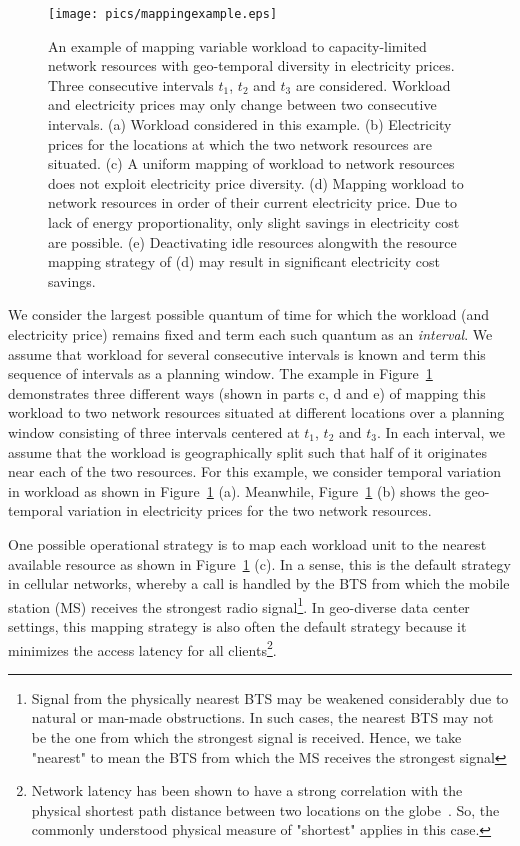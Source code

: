 \begin{figure}
\centering
\texttt{[image: pics/mappingexample.eps]}
\caption{An example of mapping variable workload to capacity-limited network resources with geo-temporal diversity in electricity prices. Three consecutive intervals $t_1$, $t_2$ and $t_3$ are considered. Workload and electricity prices may only change between two consecutive intervals. (a) Workload considered in this example. (b) Electricity prices for the locations at which the two network resources are situated. (c) A uniform mapping of workload to network resources does not exploit electricity price diversity. (d) Mapping workload to network resources in order of their current electricity price. Due to lack of energy proportionality, only slight savings in electricity cost are possible. (e) Deactivating idle resources alongwith the resource mapping strategy of (d) may result in significant electricity cost savings.}
\label{fig:mappingexample}
\end{figure}

We consider the largest possible quantum of time for which the workload (and electricity price) remains fixed and term each such quantum as an \textit{interval}. We assume that workload for several consecutive intervals is known and term this sequence of intervals as a planning window. The example in Figure~\ref{fig:mappingexample} demonstrates three different ways (shown in parts c, d and e) of mapping this workload to two network resources situated at different locations over a planning window consisting of three intervals centered at $t_1$, $t_2$ and $t_3$. In each interval, we assume that the workload is geographically split such that half of it originates near each of the two resources. For this example, we consider temporal variation in workload as shown in Figure~\ref{fig:mappingexample} (a). Meanwhile, Figure~\ref{fig:mappingexample} (b) shows the geo-temporal variation in electricity prices for the two network resources.

One possible operational strategy is to map each workload unit to the nearest available resource as shown in Figure~\ref{fig:mappingexample} (c). In a sense, this is the default strategy in cellular networks, whereby a call is handled by the BTS from which the mobile station (MS) receives the strongest radio signal\footnote{Signal from the physically nearest BTS may be weakened considerably due to natural or man-made obstructions. In such cases, the nearest BTS may not be the one from which the strongest signal is received. Hence, we take "nearest" to mean the BTS from which the MS receives the strongest signal}. In geo-diverse data center settings, this mapping strategy is also often the default strategy because it minimizes the access latency for all clients\footnote{Network latency has been shown to have a strong correlation with the physical shortest path distance between two locations on the globe~\cite{dina:p2pdelay:infocom:2004}. So, the commonly understood physical measure of "shortest" applies in this case.}. 


